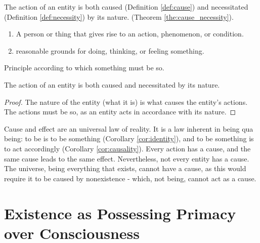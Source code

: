         The action of an entity is both caused (Definition \ref{def:cause}) and necessitated (Definition \ref{def:necessity}) by its nature. (Theorem \ref{the:cause_necessity}).

            \begin{definition}[Cause]
            \label{def:cause}
                \begin{enumerate}
                    \item A person or thing that gives rise to an action, phenomenon, or condition.
                    \item reasonable grounds for doing, thinking, or feeling something.
                \end{enumerate}
            \end{definition}
        
            \begin{definition}[Necessity]
            \label{def:necessity}
                Principle according to which something must be so.
            \end{definition}

            \begin{theorem}
            \label{the:cause_necessity}
                The action of an entity is both caused and necessitated by its nature.
            \end{theorem}

            \begin{proof}
                The nature of the entity (what it is) is what causes the entity's actions. The actions must be so, as an entity acts in accordance with its nature.
            \end{proof}
            
        Cause and effect are an universal law of reality. It is a law inherent in being qua being: to be is to be something (Corollary \ref{cor:identity}), and to be something is to act accordingly (Corollary \ref{cor:causality}). Every action has a cause, and the same cause leads to the same effect. Nevertheless, not every entity has a cause. The universe, being everything that exists, cannot have a cause, as this would require it to be caused by nonexistence - which, not being, cannot act as a cause.
        
    \section{Existence as Possessing Primacy over Consciousness}
        
